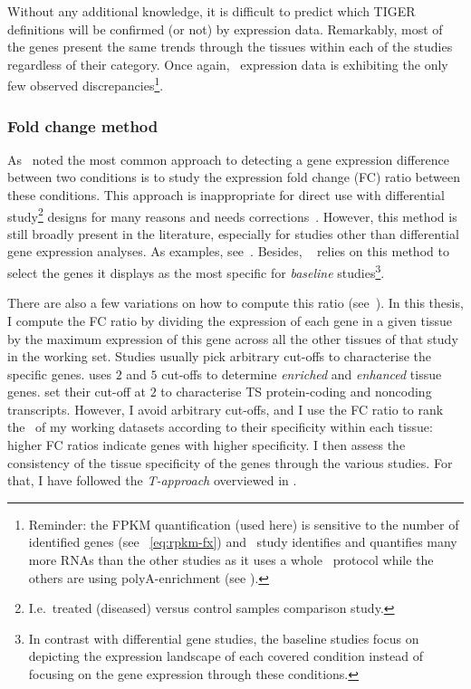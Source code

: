 Without any additional knowledge,
it is difficult to predict which \gls{TIGER}
definitions will be confirmed (or not) by expression data.
Remarkably, most of the genes present the same trends
through the tissues within each of the studies regardless of their category.
Once again, \castle\ expression data is exhibiting
the only few observed discrepancies\footnote{Reminder:
the \gls{FPKM} quantification (used here) is sensitive
to the number of identified genes (see ~\vref{eq:rpkm-fx})
and \castle\ study identifies and quantifies many more \glspl{RNA} than the
other studies as it uses a whole \RNA\ protocol
while the others are using polyA-enrichment (see ).}.

\subsubsection{Fold change method}\label{subsub:TisSpeGeneMethodPerso}

As~\cite{DESeq2} noted the most common approach to detecting
a gene expression difference between two conditions is
to study the expression fold change (FC) ratio between these conditions.
This approach is inappropriate for direct use
with differential study\footnote{I.e.\ treated (diseased)
versus control samples comparison study.}
designs for many reasons and
needs corrections~.
However, this method is still broadly present in the literature,
especially for studies other than differential gene expression analyses.
As examples, see~\cite{Uhlen2015,Zhu2016-xo,Yu2015-uh}.
Besides, \egxa\  relies on this method to select the genes
it displays as the most specific for \emph{baseline} studies\footnote{In
contrast with differential gene studies,
the baseline studies focus on
depicting the expression landscape of each covered condition
instead of focusing on the gene expression through these conditions.}.

There are also a few variations
on how to compute this ratio (see~\cite{Zhu2016-xo,Uhlen2015}).
In this thesis,
I compute the FC ratio by dividing the expression
of each gene in a given tissue
by the maximum expression of this gene across all the other tissues of that study
in the working set.
Studies usually pick arbitrary cut-offs to characterise the specific genes.
\cite{Uhlen2015} uses $2$ and $5$ cut-offs
to determine \emph{enriched} and \emph{enhanced} tissue genes.
\cite{Zhu2016-xo} set their cut-off at $2$ to characterise \gls{TS} protein-coding
and noncoding transcripts.
However,
I avoid arbitrary cut-offs, and
I use the FC ratio to rank the \pcgs\ of my working datasets according
to their specificity within each tissue:
higher FC ratios indicate genes with higher specificity.
I then assess the consistency of the tissue specificity of the genes through the
various studies.
For that, I have followed the \emph{T-approach} overviewed in .

